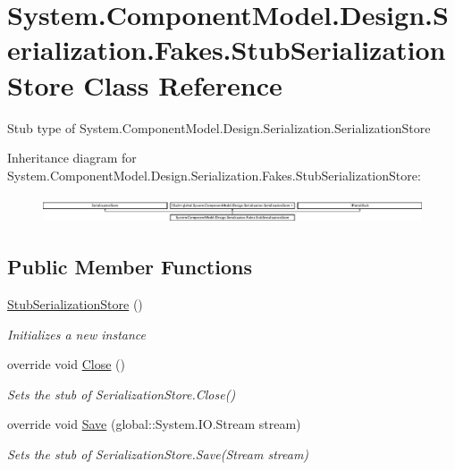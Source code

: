 \hypertarget{class_system_1_1_component_model_1_1_design_1_1_serialization_1_1_fakes_1_1_stub_serialization_store}{\section{System.\-Component\-Model.\-Design.\-Serialization.\-Fakes.\-Stub\-Serialization\-Store Class Reference}
\label{class_system_1_1_component_model_1_1_design_1_1_serialization_1_1_fakes_1_1_stub_serialization_store}
}


Stub type of System.\-Component\-Model.\-Design.\-Serialization.\-Serialization\-Store 


Inheritance diagram for System.\-Component\-Model.\-Design.\-Serialization.\-Fakes.\-Stub\-Serialization\-Store\-:\begin{figure}[H]
\begin{center}
\leavevmode
\includegraphics[height=0.792640cm]{class_system_1_1_component_model_1_1_design_1_1_serialization_1_1_fakes_1_1_stub_serialization_store}
\end{center}
\end{figure}
\subsection*{Public Member Functions}
\begin{DoxyCompactItemize}
\item 
\hyperlink{class_system_1_1_component_model_1_1_design_1_1_serialization_1_1_fakes_1_1_stub_serialization_store_abcc935f051b120a02447390db659a1c5}{Stub\-Serialization\-Store} ()
\begin{DoxyCompactList}\small\item\em Initializes a new instance\end{DoxyCompactList}\item 
override void \hyperlink{class_system_1_1_component_model_1_1_design_1_1_serialization_1_1_fakes_1_1_stub_serialization_store_af0da7ebf1e95e1f99a295533fd14db0d}{Close} ()
\begin{DoxyCompactList}\small\item\em Sets the stub of Serialization\-Store.\-Close()\end{DoxyCompactList}\item 
override void \hyperlink{class_system_1_1_component_model_1_1_design_1_1_serialization_1_1_fakes_1_1_stub_serialization_store_a19a83d2401337015e592729fbe6fc17f}{Save} (global\-::\-System.\-I\-O.\-Stream stream)
\begin{DoxyCompactList}\small\item\em Sets the stub of Serialization\-Store.\-Save(\-Stream stream)\end{DoxyCompactList}\end{DoxyCompactItemize}
